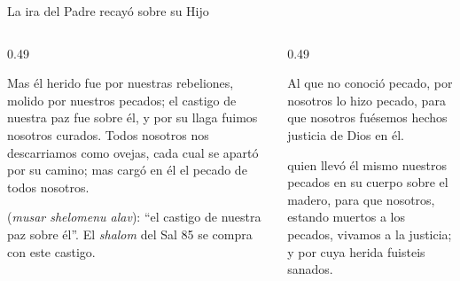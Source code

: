 \begin{frame}{La ira del Padre recayó sobre su Hijo}
\begin{columns}[t,onlytextwidth]
\begin{column}{0.49\textwidth}
\begin{cita}Mas él herido fue por nuestras rebeliones, molido por nuestros pecados; el castigo de nuestra paz fue sobre él, y por su llaga fuimos nosotros curados. Todos nosotros nos descarriamos como ovejas, cada cual se apartó por su camino; mas \SENOR{} cargó en él el pecado de todos nosotros.\end{cita}
\scriptsize{} (\emph{musar shelomenu alav}): ``el castigo de nuestra paz sobre él''. El \emph{shalom} del Sal 85 se compra con este castigo.
\end{column}
\begin{column}{0.49\textwidth}
\begin{cita}Al que no conoció pecado, por nosotros lo hizo pecado, para que nosotros fuésemos hechos justicia de Dios en él.\end{cita}
\begin{cita}quien llevó él mismo nuestros pecados en su cuerpo sobre el madero, para que nosotros, estando muertos a los pecados, vivamos a la justicia; y por cuya herida fuisteis sanados.\end{cita}
\end{column}
\end{columns}
\end{frame}

